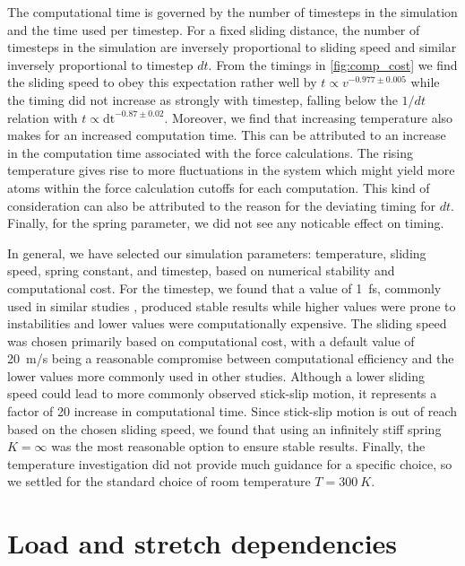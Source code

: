 The computational time is governed by the number of timesteps in the simulation
and the time used per timestep. For a fixed sliding distance, the number of timesteps in the simulation are inversely proportional
to sliding speed and similar inversely proportional to timestep $dt$. From the
timings in \cref{fig:comp_cost} we find the sliding speed to obey this
expectation rather well by $t \propto v^{-0.977 \pm 0.005}$ while the timing did
not increase as strongly with timestep, falling below the $1/dt$ relation with $t
\propto \text{dt}^{-0.87\pm 0.02}$. Moreover, we find that increasing
temperature also makes for an increased computation time. This can be attributed
to an increase in the computation time associated with the force calculations. The
rising temperature gives rise to more fluctuations in the system which might
yield more atoms within the force calculation cutoffs for each computation. This kind of consideration can also be attributed to the reason for the deviating timing for $dt$. Finally, for the spring parameter, we did not see any noticable effect on timing.


In general, we have selected our simulation parameters: temperature, sliding speed, spring constant, and timestep, based on numerical stability
and computational cost. For the timestep, we found that a value of \SI{1}{fs},
commonly used in similar studies \cite{liu_high-speed_2014, zhu_study_2018},
produced stable results while higher values were prone to instabilities and
lower values were computationally expensive. The sliding speed was chosen primarily based on computational cost, with a default value of \SI{20}{m/s} being a reasonable compromise between computational efficiency and the lower values more commonly used in other studies. Although a lower sliding speed could lead to more commonly observed stick-slip motion, it represents a factor of 20 increase in computational time. Since stick-slip motion is out of reach based on the chosen sliding speed, we found that using an infinitely stiff spring $K = \infty$ was the most reasonable option to ensure stable results. Finally, the temperature investigation did not provide much guidance for a specific choice, so we settled for the standard choice of room temperature $T = \SI{300}{K}$.



\section{Load and stretch dependencies}\label{sec:load_and_stretch}

